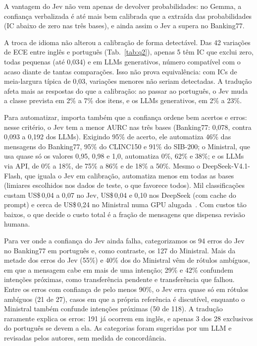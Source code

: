 \documentclass[sigconf,nonacm]{acmart}
\begin{document}
A vantagem do Jev não vem apenas de devolver probabilidades: no Gemma, a confiança verbalizada é até mais bem calibrada que a extraída das probabilidades (IC abaixo de zero nas três bases), e ainda assim o Jev a supera no Banking77.

A troca de idioma não alterou a calibração de forma detectável. Das 42 variações de ECE entre inglês e português (Tab.~\ref{tab:q2}), apenas 5 têm IC que exclui zero, todas pequenas (até 0,034) e em LLMs generativos, número compatível com o acaso diante de tantas comparações. Isso não prova equivalência: com ICs de meia-largura típica de 0,03, variações menores não seriam detectadas. A tradução afeta mais as respostas do que a calibração: ao passar ao português, o Jev muda a classe prevista em 2\% a 7\% dos itens, e os LLMs generativos, em 2\% a 23\%.

Para automatizar, importa também que a confiança ordene bem acertos e erros: nesse critério, o Jev tem a menor AURC nas três bases (Banking77: 0,078, contra 0,093 a 0,192 dos LLMs). Exigindo 95\% de acerto, ele automatiza 46\% das mensagens do Banking77, 95\% do CLINC150 e 91\% do SIB-200; o Ministral, que usa quase só os valores 0,95, 0,98 e 1,0, automatiza 0\%, 62\% e 38\%; e os LLMs via API, de 0\% a 18\%, de 75\% a 86\% e de 18\% a 50\%. Mesmo o DeepSeek-V4.1-Flash, que iguala o Jev em calibração, automatiza menos em todas as bases (limiares escolhidos nos dados de teste, o que favorece todos). Mil classificações custam US\$\,0,04 a 0,07 no Jev, US\$\,0,04 e 0,10 nos DeepSeek (com cache do prompt) e cerca de US\$\,0,24 no Ministral numa GPU alugada~\cite{getdeploying_l40s}. Com custos tão baixos, o que decide o custo total é a fração de mensagens que dispensa revisão humana.

Para ver onde a confiança do Jev ainda falha, categorizamos os 94 erros do Jev no Banking77 em português e, como contraste, os 127 do Ministral. Mais da metade dos erros do Jev (55\%) e 40\% dos do Ministral vêm de rótulos ambíguos, em que a mensagem cabe em mais de uma intenção; 29\% e 42\% confundem intenções próximas, como transferência pendente e transferência que falhou. Entre os erros com confiança de pelo menos 90\%, o Jev erra quase só em rótulos ambíguos (21 de 27), casos em que a própria referência é discutível, enquanto o Ministral também confunde intenções próximas (50 de 118). A tradução raramente explica os erros: 191 já ocorrem em inglês, e apenas 3 dos 28 exclusivos do português se devem a ela. As categorias foram sugeridas por um LLM e revisadas pelos autores, sem medida de concordância.
\end{document}
